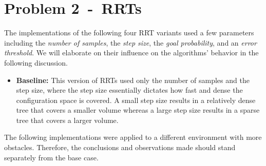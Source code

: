 \documentclass[12pt]{article}
\newcommand{\problem}[2]{\section*{Problem {#1}~-~{#2}}}
\begin{document}
\problem{2}{RRTs}
\label{sec:problem_2}
The implementations of the following four RRT variants used a few parameters including the \textit{number of samples}, the \textit{step size}, the \textit{goal probability}, and an \textit{error threshold}. We will elaborate on their influence on the algorithms' behavior in the following discussion.

\begin{itemize}
 \item \textbf{Baseline:} This version of RRTs used only the number of samples and the step size, where the step size essentially dictates how fast and dense the configuration space is covered. A small step size results in a relatively dense tree that covers a smaller volume whereas a large step size results in a sparse tree that covers a larger volume. 
\end{itemize}

The following implementations were applied to a different environment with more obstacles. Therefore, the conclusions and observations made should stand separately from the base case. 
\end{document}
